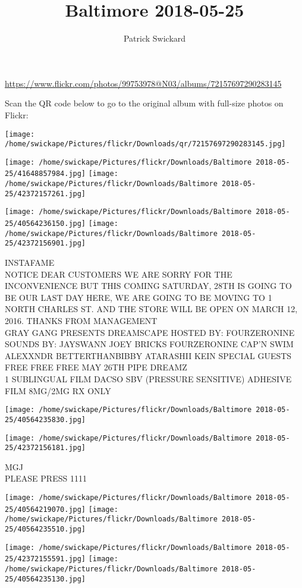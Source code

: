 \documentclass[10pt,letterpaper]{article}
\title{Baltimore 2018-05-25}
\author{Patrick Swickard}
\date{}
\begin{document}
\maketitle

\url{https://www.flickr.com/photos/99753978@N03/albums/72157697290283145}

Scan the QR code below to go to the original album with full-size photos on Flickr:

\texttt{[image: /home/swickape/Pictures/flickr/Downloads/qr/72157697290283145.jpg]}
\pagebreak

\texttt{[image: /home/swickape/Pictures/flickr/Downloads/Baltimore 2018-05-25/41648857984.jpg]}
\texttt{[image: /home/swickape/Pictures/flickr/Downloads/Baltimore 2018-05-25/42372157261.jpg]}

\texttt{[image: /home/swickape/Pictures/flickr/Downloads/Baltimore 2018-05-25/40564236150.jpg]}
\texttt{[image: /home/swickape/Pictures/flickr/Downloads/Baltimore 2018-05-25/42372156901.jpg]}

INSTAFAME\\
NOTICE DEAR CUSTOMERS WE ARE SORRY FOR THE INCONVENIENCE BUT THIS COMING SATURDAY, 28TH IS GOING TO BE OUR LAST DAY HERE, WE ARE GOING TO BE MOVING TO 1 NORTH CHARLES ST. AND THE STORE WILL BE OPEN ON MARCH 12, 2016.  THANKS FROM MANAGEMENT\\
GRAY GANG PRESENTS DREAMSCAPE HOSTED BY: FOURZERONINE SOUNDS BY: JAYSWANN JOEY BRICKS FOURZERONINE CAP'N SWIM ALEXXNDR BETTERTHANBIBBY ATARASHII KEIN SPECIAL GUESTS FREE FREE FREE MAY 26TH PIPE DREAMZ\\
1 SUBLINGUAL FILM DACSO SBV (PRESSURE SENSITIVE) ADHESIVE FILM 8MG/2MG RX ONLY
\pagebreak

\texttt{[image: /home/swickape/Pictures/flickr/Downloads/Baltimore 2018-05-25/40564235830.jpg]}

\vspace{0.25in}
\texttt{[image: /home/swickape/Pictures/flickr/Downloads/Baltimore 2018-05-25/42372156181.jpg]}

MGJ\\
PLEASE PRESS 1111
\pagebreak

\texttt{[image: /home/swickape/Pictures/flickr/Downloads/Baltimore 2018-05-25/40564219070.jpg]}
\texttt{[image: /home/swickape/Pictures/flickr/Downloads/Baltimore 2018-05-25/40564235510.jpg]}

\texttt{[image: /home/swickape/Pictures/flickr/Downloads/Baltimore 2018-05-25/42372155591.jpg]}
\texttt{[image: /home/swickape/Pictures/flickr/Downloads/Baltimore 2018-05-25/40564235130.jpg]}
\end{document}
